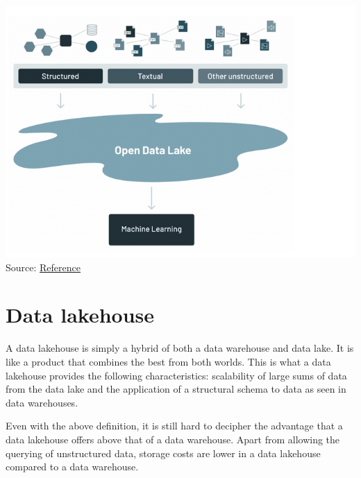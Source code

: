 \documentclass[
]{book}
\begin{document}
\includegraphics{./images/data_lake.png}
Source: \href{https://www.databricks.com/blog/2021/05/19/evolution-to-the-data-lakehouse.html}{Reference}

\hypertarget{data-lakehouse}{%
\section{Data lakehouse}\label{data-lakehouse}}

A data lakehouse is simply a hybrid of both a data warehouse and data lake. It is like a product that combines the best from both worlds. This is what a data lakehouse provides the following characteristics: scalability of large sums of data from the data lake and the application of a structural schema to data as seen in data warehouses.

Even with the above definition, it is still hard to decipher the advantage that a data lakehouse offers above that of a data warehouse. Apart from allowing the querying of unstructured data, storage costs are lower in a data lakehouse compared to a data warehouse.
\end{document}
